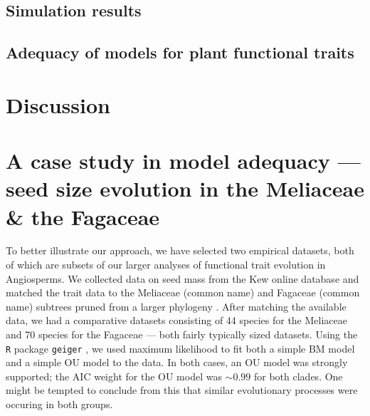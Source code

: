 \documentclass[a4paper,12pt]{article}
\begin{document}
\subsection*{Simulation results}

\subsection*{Adequacy of models for plant functional traits}

\section*{Discussion}

\section*{A case study in model adequacy --- seed size evolution in the Meliaceae \& the Fagaceae}
To better illustrate our approach, we have selected two empirical datasets, both of which are subsets of our larger analyses of functional trait evolution in Angiosperms. We collected data on seed mass from the Kew online database \citep{Kew2008} and matched the trait data to the Meliaceae (common name) and Fagaceae (common name) subtrees pruned from a larger phylogeny \citep{Zanne2013}. After matching the available data, we had a comparative datasets consisting of 44 species for the Meliaceae and 70 species for the Fagaceae --- both fairly typically sized datasets.  Using the \texttt{R} package \texttt{geiger} \citep{geiger}, we used maximum likelihood to fit both a simple BM model and a simple OU model to the data. In both cases, an OU model was strongly supported; the AIC weight for the OU model was $\sim 0.99$ for both clades. One might be tempted to conclude from this that similar evolutionary processes were occuring in both groups. 
\end{document}
